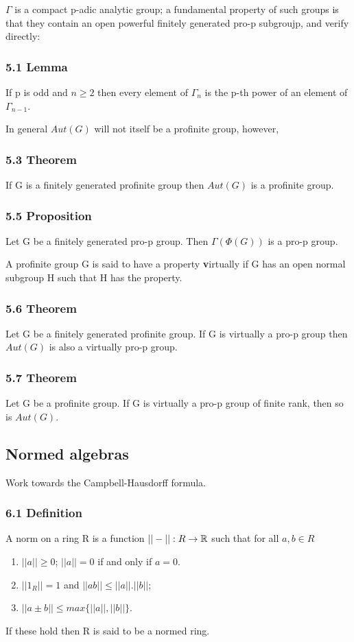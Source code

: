 $\Gamma$ is a compact p-adic analytic group; a fundamental property of such groups is that they contain an open powerful finitely generated pro-p subgroujp, and  verify directly:

\subsubsection*{5.1 Lemma}
If p is odd and $n\geq 2$ then every element of $\Gamma_n$ is the p-th power of an element of $\Gamma_{n-1}$.

In general $Aut(G)$ will not itself be a profinite group, however,

\subsubsection*{5.3 Theorem}
If G is a finitely generated profinite group then $Aut(G)$ is a profinite group.

\subsubsection{5.5 Proposition}
Let G be a finitely generated pro-p group. Then $\Gamma(\Phi(G))$ is a pro-p group.

A profinite group G is said to have a property \textbf virtually if G has an open normal subgroup H such that H has the property.

\subsubsection{5.6 Theorem}
Let G be a finitely generated profinite group. If G is virtually a pro-p group then $Aut(G)$ is also a virtually pro-p group.

\subsubsection{5.7 Theorem}
Let G be a profinite group. If G is virtually a pro-p group of finite rank, then so is $Aut(G)$.



\subsection{Normed algebras}

Work towards the Campbell-Hausdorff formula.

\subsubsection*{6.1 Definition}
A norm on a ring R is a function $||-||:R\rightarrow \mathbb R$ such that for all $a,b\in R$
\begin{enumerate}
\item $||a||\geq 0$; $||a||=0$ if and only if $a=0$.
\item $||1_R||=1$ and $||ab||\leq||a||.||b||$;
\item $||a\pm b||\leq max\{||a||,||b||\}$.
\end{enumerate}
If these hold then R is said to be a normed ring.


